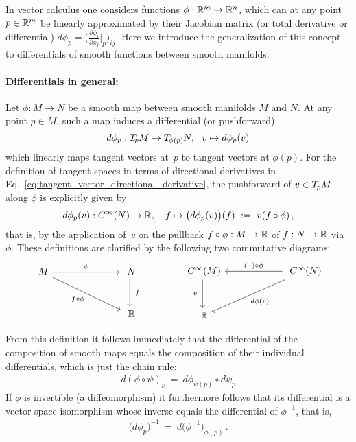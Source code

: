 In vector calculus one considers functions $\phi: \mathbb{R}^m \to \mathbb{R}^n$, which can at any point $p\in \mathbb{R}^m$ be linearly approximated by their Jacobian matrix (or total derivative or differential) $d\phi_p = \big(\frac{\partial\phi_i}{\partial x_j} \big|_p \big)_{ij}$.
Here we introduce the generalization of this concept to differentials of smooth functions between smooth manifolds.

\paragraph{Differentials in general:}
Let $\phi: M \to N$ be a smooth map between smooth manifolds $M$ and $N$.
At any point $p\in M$, such a map induces a differential (or pushforward)
\begin{align}
    d\phi_p : \TpM \to \TphipN,\ \ v \mapsto d\phi_p(v)
\end{align}
which linearly maps tangent vectors at~$p$ to tangent vectors at $\phi(p)$.
For the definition of tangent spaces in terms of directional derivatives in Eq.~\eqref{eq:tangent_vector_directional_derivative}, the pushforward of $v \in T_{\mkern-1.5mu p}\mkern-.5muM$ along $\phi$ is explicitly given by
\begin{align}
    d\phi_p(v): C^\infty(N) \to \R,\ \ \ f \mapsto \big( d\phi_p(v) \big)(f)\ :=\ v(f \circ \phi) \,,
\end{align}
that is, by the application of~$v$ on the pullback $f \circ \phi: M \to \mathbb{R}$ of $f: N\to \mathbb{R}$ via $\phi$.
These definitions are clarified by the following two commutative diagrams:
\begin{equation}
\begin{tikzcd}[column sep=70pt, row sep=30, font=\normalsize]
    M
        \arrow[r, "\phi"]
        \arrow[dr, "f \circ \phi"']
    &
    N
        \arrow[d, "\ f"]
    \\
    & \R
\end{tikzcd}
\qquad\qquad
\begin{tikzcd}[column sep=60pt, row sep=30, font=\normalsize]
    C^\infty(M)
        \arrow[d, "v\ "']
    &
    C^\infty(N)
        \arrow[l, "(\,\cdot\,) \circ \phi"']
        \arrow[dl, "d\phi(v)"]
    \\
    \R
\end{tikzcd}
\end{equation}

From this definition it follows immediately that the differential of the composition of smooth maps equals the composition of their individual differentials, which is just the chain rule:
\begin{align}
    d(\phi \circ \psi)_p\ =\ d\phi_{\psi(p)} \circ d\psi_p
\end{align}
If $\phi$ is invertible (a diffeomorphism) it furthermore follows that its differential is a vector space isomorphism whose inverse equals the differential of $\phi^{-1}$, that is,
\begin{align}\label{eq:differential_inverse}
    \big( d\phi_{p} \big)^{-1}\ =\ d\big( \phi^{-1} \big)_{\phi(p)} \,.
\end{align}

